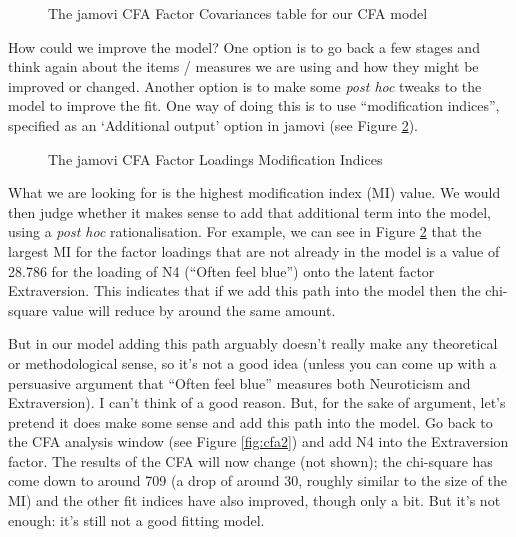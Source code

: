 \begin{figure}[!htb]
\begin{center}
\caption{The jamovi CFA Factor Covariances table for our CFA model}
\label{fig:cfa5}
\HR
\end{center}
\end{figure}

How could we improve the model? One option is to go back a few stages and think again about the items / measures we are using and how they might be improved or changed. Another option is to make some {\it post hoc} tweaks to the model to improve the fit. One way of doing this is to use “modification indices”, specified as an ‘Additional output’ option in jamovi (see Figure \ref{fig:cfa6}).

\begin{figure}[!htb]
\begin{center}
\caption{The jamovi CFA Factor Loadings Modification Indices}
\label{fig:cfa6}
\HR
\end{center}
\end{figure}

What we are looking for is the highest modification index (MI) value. We would then judge whether it makes sense to add that additional term into the model, using a {\it post hoc} rationalisation. For example, we can see in Figure \ref{fig:cfa6} that the largest MI for the factor loadings that are not already in the model is a value of 28.786 for the loading of N4 (“Often feel blue”) onto the latent factor Extraversion. This indicates that if we add this path into the model then the chi-square value will reduce by around the same amount. 

But in our model adding this path arguably doesn't really make any theoretical or methodological sense, so it’s not a good idea (unless you can come up with a persuasive argument that “Often feel blue” measures both Neuroticism and Extraversion). I can't think of a good reason. But, for the sake of argument, let’s pretend it does make some sense and add this path into the model. Go back to the CFA analysis window (see Figure \ref{fig:cfa2}) and add N4 into the Extraversion factor. The results of the CFA will now change (not shown); the chi-square has come down to around 709 (a drop of around 30, roughly similar to the size of the MI) and the other fit indices have also improved, though only a bit. But it's not enough: it’s still not a good fitting model.

